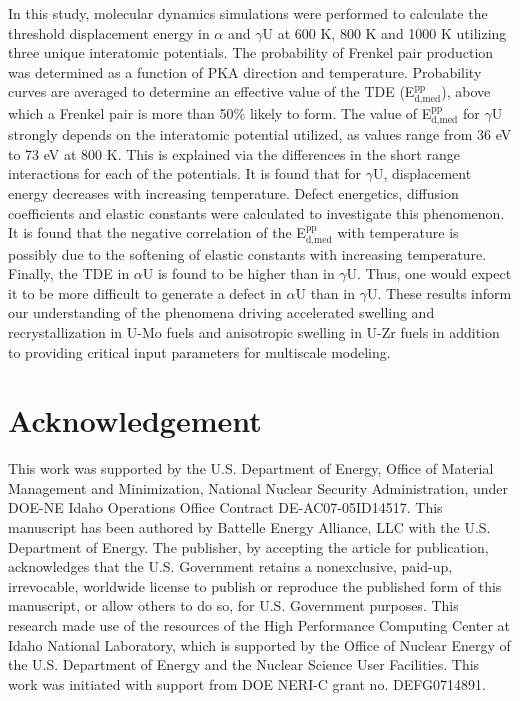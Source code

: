 \documentclass[review]{elsarticle}
\begin{document}
In this study, molecular dynamics simulations were performed to calculate the threshold displacement energy in $\alpha$ and $\gamma$U at 600 K, 800 K and 1000 K utilizing three unique interatomic potentials. The probability of Frenkel pair production was determined as a function of PKA direction and temperature. Probability curves are averaged to determine an effective value of the TDE (E$^{\textrm{pp}}_{\textrm{d,med}}$), above which a Frenkel pair is more than 50$\%$ likely to form. The value of E$^{\textrm{pp}}_{\textrm{d,med}}$ for $\gamma$U strongly depends on the interatomic potential utilized, as values range from 36 eV to 73 eV at 800 K. This is explained via the differences in the short range interactions for each of the potentials. It is found that for $\gamma$U, displacement energy decreases with increasing temperature. Defect energetics, diffusion coefficients and elastic constants were calculated to investigate this phenomenon. It is found that the negative correlation of the E$^{\textrm{pp}}_{\textrm{d,med}}$ with temperature is possibly due to the softening of elastic constants with increasing temperature. Finally, the TDE in $\alpha$U is found to be higher than in $\gamma$U. Thus, one would expect it to be more difficult to generate a defect in $\alpha$U than in $\gamma$U. These results inform our understanding of the phenomena driving accelerated swelling and recrystallization in U-Mo fuels and anisotropic swelling in U-Zr fuels in addition to providing critical input parameters for multiscale modeling.

\section{Acknowledgement}
This work was supported by the U.S. Department of Energy, Office of Material Management and Minimization, National Nuclear Security Administration, under DOE-NE Idaho Operations Office Contract DE-AC07-05ID14517. This manuscript has been authored by Battelle Energy Alliance, LLC with the U.S. Department of Energy. The publisher, by accepting the article for publication, acknowledges that the U.S. Government retains a nonexclusive, paid-up, irrevocable, worldwide license to publish or reproduce the published form of this manuscript, or allow others to do so, for U.S. Government purposes. This research made use of the resources of the High Performance Computing Center at Idaho National Laboratory, which is supported by the Office of Nuclear Energy of the U.S. Department of Energy and the Nuclear Science User Facilities. This work was initiated with support from DOE NERI-C grant no. DEFG0714891.
\end{document}
